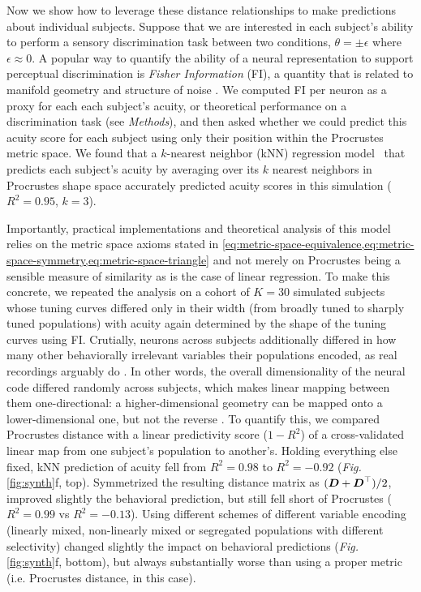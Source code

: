 
Now we show how to leverage these distance relationships to make predictions about individual subjects.
Suppose that we are interested in each subject's ability to perform a sensory discrimination task between two conditions, ${\theta = \pm \epsilon}$ where ${\epsilon \approx 0}$.
A popular way to quantify the ability of a neural representation to support perceptual discrimination is \textit{Fisher Information} (FI), a quantity that is related to manifold geometry and structure of noise \parencite[see e.g.,][]{Kriegeskorte2021}.
We computed FI per neuron as a proxy for each each subject's acuity, or theoretical performance on a discrimination task (see \textit{Methods}), and then asked whether we could predict this acuity score for each subject using only their position within the Procrustes metric space.
We found that a $k$-nearest neighbor (kNN) regression model~\parencite{Cover1967} that predicts each subject's acuity by averaging over its $k$ nearest neighbors in Procrustes shape space accurately predicted acuity scores in this simulation ($R^2 = 0.95$, $k=3$).

Importantly, practical implementations and theoretical analysis of this model relies on the metric space axioms stated in \cref{eq:metric-space-equivalence,eq:metric-space-symmetry,eq:metric-space-triangle} and not merely on Procrustes being a sensible measure of similarity as is the case of linear regression. To make this concrete, we repeated the analysis on a cohort of $K = 30$ simulated subjects whose tuning curves differed only in their width (from broadly tuned to sharply tuned populations) with acuity again determined by the shape of the tuning curves using FI. Crutially, neurons across subjects additionally differed in how many other behaviorally irrelevant variables their populations encoded, as real recordings arguably do \parencite{rigotti2013,tye2024}. In other words, the overall dimensionality of the neural code differed randomly across subjects, which makes linear mapping between them one-directional: a higher-dimensional geometry can be mapped onto a lower-dimensional one, but not the reverse \parencite{elmoznino2024,muzellec2026reverse}. To quantify this, we compared  Procrustes distance with a linear predictivity score ($1 - R^2$) of a cross-validated linear map from one subject's population to another's. Holding everything else fixed, kNN prediction of acuity fell from $R^2 = 0.98$ to $R^2 = -0.92$ (\textit{Fig.} \ref{fig:synth}f, top). Symmetrized the resulting distance matrix as $(\boldsymbol{D} + \boldsymbol{D}^\top)/2$, improved slightly the behavioral prediction, but still fell short of Procrustes ($R^2 = 0.99$ vs $R^2 = -0.13$). Using different schemes of different variable encoding (linearly mixed, non-linearly mixed or segregated populations with different selectivity) changed slightly the impact on behavioral predictions (\textit{Fig.} \ref{fig:synth}f, bottom), but always substantially worse than using a proper metric (i.e. Procrustes distance, in this case). 